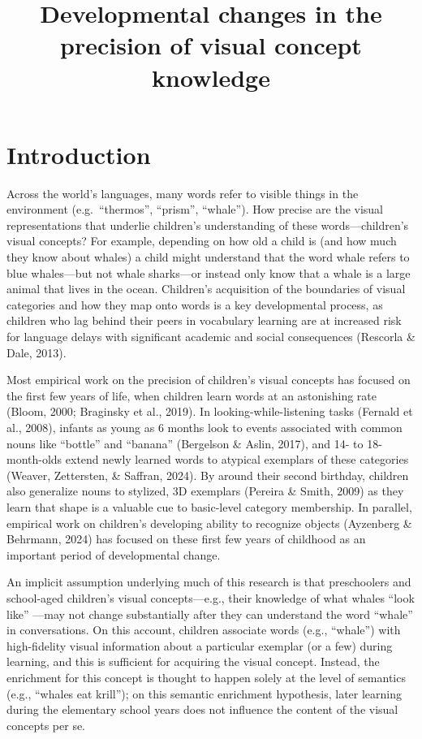 \documentclass[
  man,mask]{apa6}
\title{Developmental changes in the precision of visual concept knowledge}
\author{\phantom{0}}
\date{}
\affiliation{\phantom{0}}
\begin{document}
\maketitle

\section{Introduction}\label{introduction}

Across the world's languages, many words refer to visible things in the environment (e.g.~``thermos'', ``prism'', ``whale''). How precise are the visual representations that underlie children's understanding of these words---children's visual concepts? For example, depending on how old a child is (and how much they know about whales) a child might understand that the word whale refers to blue whales---but not whale sharks---or instead only know that a whale is a large animal that lives in the ocean. Children's acquisition of the boundaries of visual categories and how they map onto words is a key developmental process, as children who lag behind their peers in vocabulary learning are at increased risk for language delays with significant academic and social consequences (Rescorla \& Dale, 2013).

Most empirical work on the precision of children's visual concepts has focused on the first few years of life, when children learn words at an astonishing rate (Bloom, 2000; Braginsky et al., 2019). In looking-while-listening tasks (Fernald et al., 2008), infants as young as 6 months look to events associated with common nouns like ``bottle'' and ``banana'' (Bergelson \& Aslin, 2017), and 14- to 18-month-olds extend newly learned words to atypical exemplars of these categories (Weaver, Zettersten, \& Saffran, 2024). By around their second birthday, children also generalize nouns to stylized, 3D exemplars (Pereira \& Smith, 2009) as they learn that shape is a valuable cue to basic-level category membership. In parallel, empirical work on children's developing ability to recognize objects (Ayzenberg \& Behrmann, 2024) has focused on these first few years of childhood as an important period of developmental change.

An implicit assumption underlying much of this research is that preschoolers and school-aged children's visual concepts---e.g., their knowledge of what whales ``look like'' ---may not change substantially after they can understand the word ``whale'' in conversations. On this account, children associate words (e.g., ``whale'') with high-fidelity visual information about a particular exemplar (or a few) during learning, and this is sufficient for acquiring the visual concept. Instead, the enrichment for this concept is thought to happen solely at the level of semantics (e.g., ``whales eat krill''); on this semantic enrichment hypothesis, later learning during the elementary school years does not influence the content of the visual concepts per se.
\end{document}

